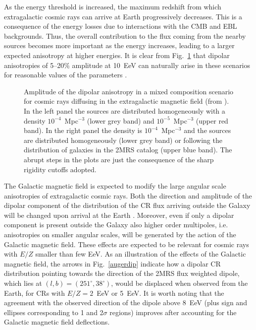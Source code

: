 \documentclass[twoside,12pt]{article}
\begin{document}
 As the energy threshold is increased, the maximum redshift from which extragalactic cosmic rays can arrive at Earth progressively decreases. This is a consequence of the energy losses due to interactions with the CMB and EBL backgrounds. Thus, the overall contribution to the flux coming from the nearby sources becomes more important as the energy increases, leading to a larger expected anisotropy at higher energies. It is clear from  Fig.~\ref{difudip} that dipolar anisotropies of 5--20\% amplitude at 10~EeV can naturally arise in these scenarios for reasonable values of the parameters \cite{hmr15}. 
\begin{figure}
\begin{center}
\begin{minipage}[t]{8 cm}
\centerline{}
\end{minipage}
\begin{minipage}[t]{16.5 cm}
\caption{Amplitude of the dipolar anisotropy in a mixed composition scenario for cosmic rays diffusing in the extragalactic magnetic field (from \cite{hmr15}). In the left panel the sources are distributed homogeneously with a density $10^{-4}$~Mpc$^{-3}$ (lower grey band) and $10^{-5}$~Mpc$^{-3}$ (upper red band). In the right panel the density is $10^{-4}$~Mpc$^{-3}$ and the sources are distributed homogeneously (lower grey band) or following the distribution of galaxies in the 2MRS catalog (upper blue band). The abrupt steps in the plots are just the consequence of the sharp rigidity cutoffs adopted. \label{difudip}}
\end{minipage}
\end{center}
\end{figure}

The Galactic magnetic field is expected to modify the large angular scale anisotropies of extragalactic cosmic rays.
 Both the direction and amplitude of the dipolar component of the distribution of the CR flux arriving outside the Galaxy will be changed upon arrival at the Earth \cite{hmr10}. Moreover, even if only a dipolar component is present outside the Galaxy  also higher order multipoles, i.e. anisotropies on smaller angular scales,  will be generated by the action of the Galactic magnetic field. These effects are expected to be relevant for cosmic rays with $E/Z$ smaller than few EeV. 
 As an illustration of the effects of the Galactic magnetic field, the arrows in  Fig.~\ref{augerdip}  indicate how a dipolar CR distribution pointing towards the direction of the 2MRS flux weighted dipole, which lies at $(l,b)=(251^\circ, 38^\circ)$,  would be displaced when observed from the Earth, for CRs with $E/Z=2$~EeV or 5~EeV. It is worth noting that the agreement with the observed direction of the dipole above 8~EeV (plus sign and ellipses corresponding to 1 and 2$\sigma$ regions) improves after accounting for the Galactic magnetic field deflections.
\end{document}
